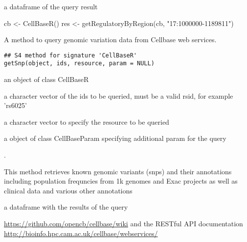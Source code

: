 \documentclass[letterpaper]{book}
\begin{document}
%
\begin{Value}
a dataframe of the query result
\end{Value}
%
\begin{Examples}
\begin{ExampleCode}
cb <- CellBaseR()
res <- getRegulatoryByRegion(cb, "17:1000000-1189811")
\end{ExampleCode}
\end{Examples}
%
\begin{Description}\relax
A method to query genomic variation data from Cellbase web services.
\end{Description}
%
\begin{Usage}
\begin{verbatim}
## S4 method for signature 'CellBaseR'
getSnp(object, ids, resource, param = NULL)
\end{verbatim}
\end{Usage}
%
\begin{Arguments}
\begin{ldescription}
\item[\code{object}] an object of class CellBaseR

\item[\code{ids}] a character vector of the ids to be queried, must be a valid rsid,
for example 'rs6025'

\item[\code{resource}] a character vector to specify the resource to be queried

\item[\code{param}] a object of class CellBaseParam specifying additional param
for the query
\end{ldescription}
\end{Arguments}
%
\begin{Details}\relax
.

This method retrieves known genomic variants (snps) and their
annotations including population frequncies from 1k genomes and Exac projects
as well as clinical data and various other annotations
\end{Details}
%
\begin{Value}
a dataframe with the results of the query
\end{Value}
%
\begin{SeeAlso}\relax
\url{https://github.com/opencb/cellbase/wiki} 
and the RESTful API documentation 
\url{http://bioinfo.hpc.cam.ac.uk/cellbase/webservices/}
\end{SeeAlso}
\end{document}
